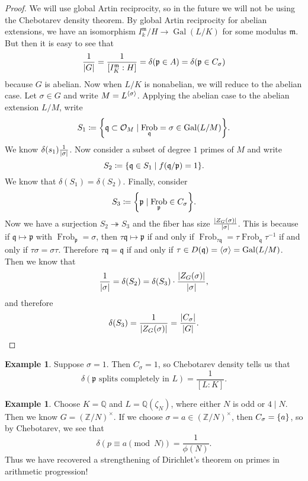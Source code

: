 \documentclass[leqno, openany]{memoir}
\theoremstyle{definition}
\newtheorem{exm}[thm]{Example}
\theoremstyle{remark}
\theoremstyle{plain}
\theoremstyle{definition}
\theoremstyle{remark}
\newcommand{\Z}{\mathbb{Z}}
\newcommand{\Q}{\mathbb{Q}}
\newcommand{\mc}[1]{\mathcal{#1}}
\newcommand{\mf}[1]{\mathfrak{#1}}
\DeclareMathOperator{\Gal}{Gal}
\DeclareMathOperator{\Frob}{Frob}
\begin{document}
\begin{proof} We will use global Artin reciprocity, so in the future we will
    not be using the Chebotarev density theorem. By global Artin reciprocity
    for abelian extensions, we have an isomorphism $I_k^{\mf{m}}/H \to
    \Gal(L/K)$ for some modulus $\mf{m}$. But then it is easy to see that \[
    \frac{1}{\abs{G}} = \frac{1}{[I_K^{\mf{m}}:H]} = \delta(\mf{p} \in A) =
\delta(\mf{p} \in C_{\sigma}) \] because $G$ is abelian. Now when $L/K$ is
nonabelian, we will reduce to the abelian case. Let $\sigma \in G$ and write $M
= L^{\ev{\sigma}}$. Applying the abelian case to the abelian extension $L/M$,
write \[ S_1 \coloneqq \qty{\mf{q} \subset \mc{O}_M \mid \Frob_{\mf{q}} =
    \sigma \in \Gal(L/M)}. \] We know $\delta(s_1) \frac{1}{\abs{\sigma}}$. Now
    consider a subset of degree $1$ primes of $M$ and write \[ S_2 \coloneqq
    \qty{\mf{q} \in S_1 \mid f(\mf{q}/{\mf{p}}) = 1}. \] We know that
    $\delta(S_1) = \delta(S_2)$. Finally, consider \[ S_3 \coloneqq \qty{\mf{p}
    \mid \Frob_{\mf{p}} \in C_{\sigma}}. \] Now we have a surjection $S_2
    \twoheadrightarrow S_3$ and the fiber has size
    $\frac{\abs{Z_G(\sigma)}}{\abs{\sigma}}$. This is because if $\mf{q}
    \mapsto \mf{p}$ with $\Frob_{\mf{p}} = \sigma$, then $\tau \mf{q} \mapsto
    \mf{p}$ if and only if $\Frob_{ \tau \mf{q} } = \tau \Frob_{\mf{q}}
    \tau^{-1}$ if and only if $\tau \sigma = \sigma\tau$. Therefore $\tau
    \mf{q} = \mf{q}$ if and only if $\tau \in D(\mf{q}) = \ev{\sigma} =
    \Gal(L/M)$. Then we know that \[ \frac{1}{\abs{\sigma}} = \delta(S_2) =
        \delta(S_3) \cdot \frac{\abs{Z_G(\sigma)}}{\abs{\sigma}}, \] and
        therefore \[ \delta(S_3) = \frac{1}{\abs{Z_G(\sigma)}} =
        \frac{\abs{C_{\sigma}}}{\abs{G}}. \qedhere \] \end{proof}

\begin{exm} Suppose $\sigma = 1$. Then $C_{\sigma} = \qty{1}$, so Chebotarev
    density tells us that \[ \delta(\mf{p} \text{ splits completely in }L) =
    \frac{1}{[L:K]}. \] \end{exm}

\begin{exm} Choose $K = \Q$ and $L = \Q(\zeta_N)$, where either $N$ is odd or
    $4 \mid N$. Then we know $G = {(\Z/N)}^{\times}$. If we choose $\sigma = a
    \in {(\Z/N)}^{\times}$, then $C_{\sigma} = \qty{a}$, so by Chebotarev, we
    see that \[ \delta(p \equiv a \pmod{N}) = \frac{1}{\phi(N)}. \] Thus we
have recovered a strengthening of Dirichlet's theorem on primes in arithmetic
progression!  \end{exm}
\end{document}
